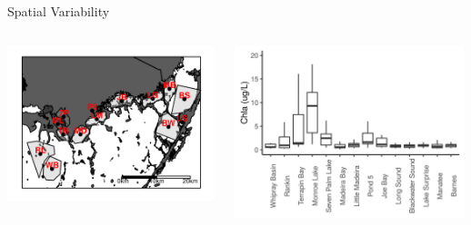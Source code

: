 \documentclass[compress,noflama,nosectionpages]{beamer}
\begin{document}
\begin{frame}{Spatial Variability}
			\begin{columns}
				\begin{column}[c]{5.3cm}
					\includegraphics[height=4.5cm,clip=true,trim = 0mm 0mm 0mm 0mm,keepaspectratio=true]{figures/fbmap_dflow.png}%
				\end{column}
				
				\begin{column}{7.0cm}
					\vspace{1em}
					\begin{center}
					\includegraphics[height=5cm,clip=true,trim = 0mm 0mm 0mm 0mm,keepaspectratio=true]{figures/chlboxplot.png}%
					\end{center}
				\end{column}
			\end{columns}
\end{frame}
\end{document}
